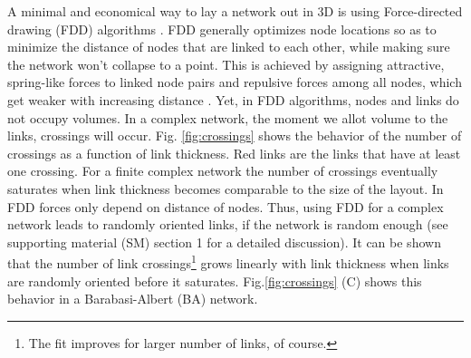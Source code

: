 \documentclass[nofootinbib,preprint,endfloats]{revtex4} %
\begin{document}
A minimal and economical way to lay a network out in 3D is using Force-directed drawing (FDD) algorithms \cite{kamada1989algorithm,davidson1996drawing,fruchterman1991graph,barnes1986hierarchical}. 
FDD generally optimizes node locations so as to minimize the distance of nodes that are linked to each other, while making sure the network won't collapse to a point. 
This is achieved by assigning attractive, spring-like forces to linked node pairs and repulsive forces among all nodes, which get weaker with increasing distance%
 \cite{kabourov2015spring}.
Yet, in FDD algorithms, nodes and links do not occupy volumes. In a complex network, the moment we allot volume to the links, crossings will occur. 
Fig. \ref{fig:crossings} shows the behavior of the number of crossings as a function of link thickness. 
Red links are the links that have at least one crossing. 
For a finite complex network the number of crossings eventually saturates when link thickness becomes comparable to the size of the layout.
In FDD forces only depend on distance of nodes. 
Thus, using FDD for a complex network leads to randomly oriented links, if the network is random enough (see supporting material (SM) section 1 for a detailed discussion).  
It can be shown that the number of link crossings\footnote{
The fit improves for larger number of links, of course.} grows linearly with link thickness when links are randomly oriented before it saturates. %
Fig.\ref{fig:crossings} (C) shows this behavior in a Barabasi-Albert (BA) network.%
%
\end{document}
